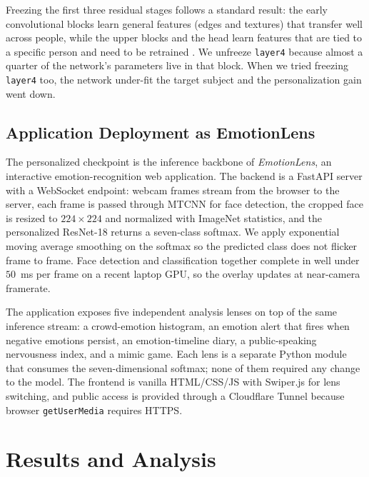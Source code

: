 \documentclass[12pt,a4paper]{article}
\begin{document}
Freezing the first three residual stages follows a standard
result: the early convolutional blocks learn general features
(edges and textures) that transfer well across people, while
the upper blocks and the head learn features that are tied to
a specific person and need to be retrained
\autocite{ganin2015dann, finn2017maml}. We unfreeze
\texttt{layer4} because almost a quarter of the network's
parameters live in that block. When we tried freezing
\texttt{layer4} too, the network under-fit the target subject
and the personalization gain went down.

\subsection{Application Deployment as EmotionLens}
\label{sec:impl:deploy}

The personalized checkpoint is the inference backbone of
\emph{EmotionLens}, an interactive emotion-recognition web
application. The backend is a FastAPI server with a WebSocket
endpoint: webcam frames stream from the browser to the server,
each frame is passed through MTCNN \autocite{zhang2016mtcnn}
for face detection, the cropped face is resized to
$224 \times 224$ and normalized with ImageNet statistics, and
the personalized ResNet-18 returns a seven-class softmax. We
apply exponential moving average smoothing on the softmax so
the predicted class does not flicker frame to frame. Face
detection and classification together complete in well under
$50$~ms per frame on a recent laptop GPU, so the overlay
updates at near-camera framerate.

The application exposes five independent analysis lenses on
top of the same inference stream: a crowd-emotion histogram,
an emotion alert that fires when negative emotions persist, an
emotion-timeline diary, a public-speaking nervousness index,
and a mimic game. Each lens is a separate Python module that
consumes the seven-dimensional softmax; none of them required
any change to the model. The frontend is vanilla HTML/CSS/JS
with Swiper.js for lens switching, and public access is
provided through a Cloudflare Tunnel because browser
\texttt{getUserMedia} requires HTTPS.

\section{Results and Analysis}
\label{sec:results}
\end{document}
